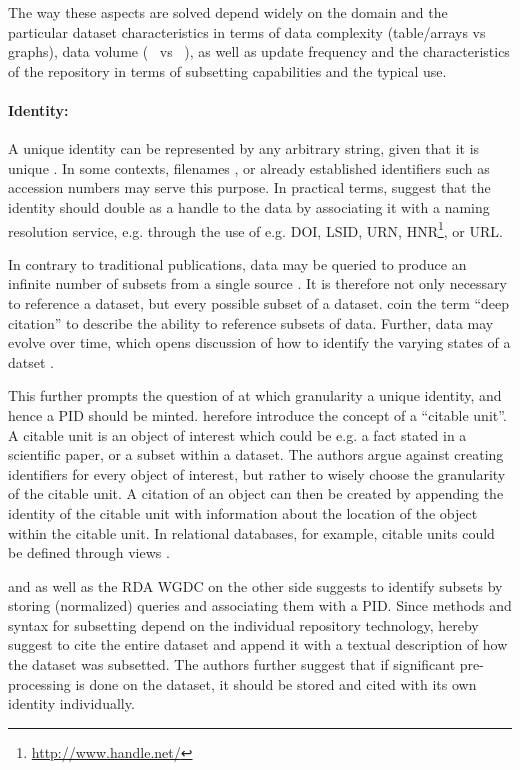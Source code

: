\documentclass[letterpaper, twocolumn, parskip=half, fontsize=8pt, DIV=calc]{scrartcl}
\begin{document}
The way these aspects are solved depend widely on the domain and the particular dataset characteristics in terms of data complexity (table/arrays vs graphs), data volume (\si{\kilo\byte} vs \si{\peta\byte}), as well as update frequency and the characteristics of the repository in terms of subsetting capabilities and the typical use.

\paragraph{Identity:}
A unique identity can be represented by any arbitrary string, given that it is unique \citep{CODATA2013}. In some contexts, filenames \citep{Buneman2016}, or already established identifiers such as accession numbers \citep{Bandrowski2016} may serve this purpose. 
In practical terms, \cite{AltKin07} suggest that the identity should double as a handle to the data by associating it with a naming resolution service, e.g. through the use of e.g. \gls{DOI},  \gls{LSID}, \gls{URN}, \gls{HNR}\footnote{\url{http://www.handle.net/}}, or \gls{URL}. 

In contrary to traditional publications, data may be queried to produce an infinite number of subsets from a single source \citep{Davidson2017, CODATA2013}. It is therefore not only necessary to reference a dataset, but every possible subset of a dataset. \citep{AltKin07} coin the term ``deep citation'' to describe the ability to reference subsets of data. Further, data may evolve over time, which opens discussion of how to identify the varying states of a datset \citep{Huber2015}. 

This further prompts the question of at which granularity a unique identity, and hence a \gls{PID} should be minted. \cite{Buneman2010} herefore introduce the concept of a ``citable unit''. A citable unit is an object of interest which could be e.g. a fact stated in a scientific paper, or a subset within a dataset. The authors argue against creating identifiers for every object of interest, but rather to wisely choose the granularity of the citable unit. A citation of an object can then be created by appending the identity of the citable unit with information about the location of the object within the citable unit. In relational databases, for example, citable units could be defined through views \citep{Buneman2016}.

\cite{Rauber2015} and \cite{Proll2013} as well as the \gls{RDA} \gls{WGDC} \citep{Rauber2015a} on the other side suggests to identify subsets by storing (normalized) queries and associating them with a \gls{PID}. Since methods and syntax for subsetting depend on the individual repository technology, \cite{AltKin07} hereby suggest to cite the entire dataset and append it with a textual description of how the dataset was subsetted. The authors further suggest that if significant pre-processing is done on the dataset, it should be stored and cited with its own identity individually. 
\end{document}
